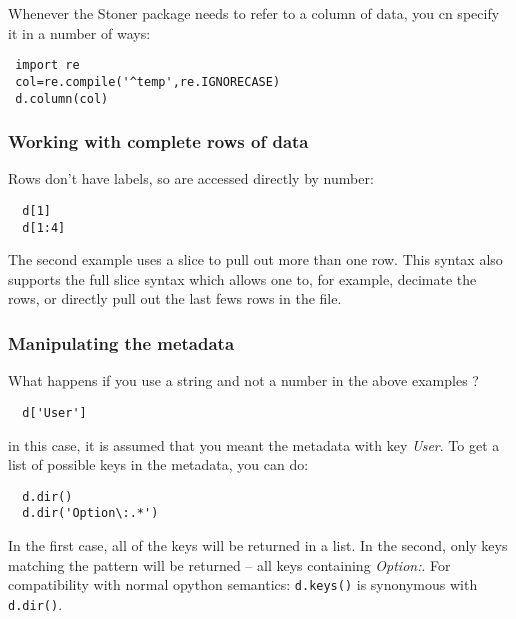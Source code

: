 \documentclass[a4paper,11pt]{scrartcl}
\begin{document}
Whenever the Stoner package needs to refer to a column of data, you cn specify it in a number of ways:
\begin{lstlisting}
 import re
 col=re.compile('^temp',re.IGNORECASE)
 d.column(col)
\end{lstlisting}

\subsubsection{Working with complete rows of data}

Rows don't have labels, so are accessed directly by number:
\begin{lstlisting}
  d[1]
  d[1:4]
\end{lstlisting}
The second example uses a slice to pull out more than one row. This syntax also
supports the full slice syntax which allows one to, for example, decimate the
rows, or directly pull out the last fews rows in the file.

\subsubsection{Manipulating the metadata}

What happens if you use a string and not a number in the above examples ?
\begin{lstlisting}
  d['User']
\end{lstlisting}
in this case, it is assumed that you meant the metadata with key \textit{User}.
To get a list of possible keys in the metadata, you can do:
\begin{lstlisting}
  d.dir()
  d.dir('Option\:.*')
\end{lstlisting}
In the first case, all of the keys will be returned in a list. In the second,
only keys matching the pattern will be returned -- all keys containing
\textit{Option:}. For compatibility with normal opython semantics: \verb#d.keys()# is
synonymous with \verb#d.dir()#.
\end{document}
